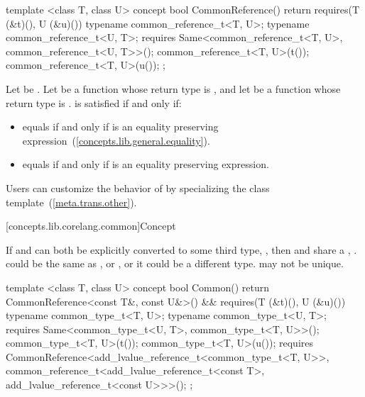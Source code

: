 %
\begin{itemdecl}
template <class T, class U>
concept bool CommonReference() {
  return requires(T (&t)(), U (&u)()) {
    typename common_reference_t<T, U>;
    typename common_reference_t<U, T>;
    requires Same<common_reference_t<T, U>,
                  common_reference_t<U, T>>();
    common_reference_t<T, U>(t());
    common_reference_t<T, U>(u());
  };
}
\end{itemdecl}

\begin{itemdescr}
\pnum
Let  be . Let  be a
function whose return type is , and let  be a function
whose return type is .  is satisfied
if and only if:
\begin{itemize}
\item {} equals  if and only if  is an
  equality preserving expression~(\ref{concepts.lib.general.equality}).
\item {} equals  if and only if  is an
  equality preserving expression.
\end{itemize}

\pnum
\enternote Users can customize the behavior of  by specializing the
 class template~(\ref{meta.trans.other}).\exitnote
\end{itemdescr}

[concepts.lib.corelang.common]{Concept }

\pnum
If  and  can both be explicitly converted to some third type,
, then  and  share a ,
. \enternote {} could be the same as , or , or
it could be a different type.  may not be unique.\exitnote

%
\begin{itemdecl}
template <class T, class U>
concept bool Common() {
  return CommonReference<const T&, const U&>() &&
    requires(T (&t)(), U (&u)()) {
      typename common_type_t<T, U>;
      typename common_type_t<U, T>;
      requires Same<common_type_t<U, T>, common_type_t<T, U>>();
      common_type_t<T, U>(t());
      common_type_t<T, U>(u());
      requires CommonReference<add_lvalue_reference_t<common_type_t<T, U>>,
                               common_reference_t<add_lvalue_reference_t<const T>,
                                                  add_lvalue_reference_t<const U>>>();
    };
}
\end{itemdecl}

